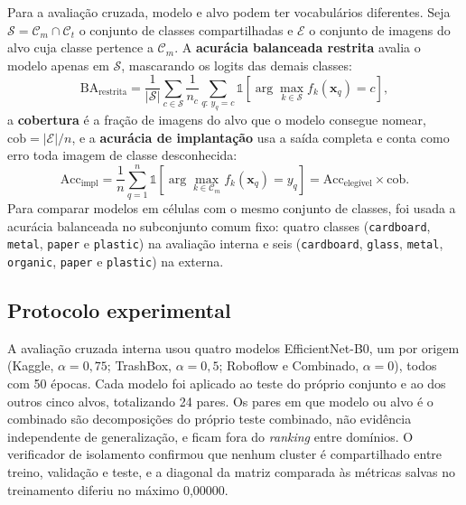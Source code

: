 \documentclass[11pt,a4paper]{article}
\begin{document}
	Para a avaliação cruzada, modelo e alvo podem ter vocabulários diferentes. Seja $\mathcal{S} = \mathcal{C}_m \cap \mathcal{C}_t$ o conjunto de classes compartilhadas e $\mathcal{E}$ o conjunto de imagens do alvo cuja classe pertence a $\mathcal{C}_m$. A \textbf{acurácia balanceada restrita} avalia o modelo apenas em $\mathcal{S}$, mascarando os logits das demais classes:
	\begin{equation}
		\text{BA}_{\text{restrita}} = \frac{1}{|\mathcal{S}|} \sum_{c \in \mathcal{S}} \frac{1}{n_c} \sum_{q:\, y_q = c} \mathbb{1}\!\left[\arg\max_{k \in \mathcal{S}} f_k(\mathbf{x}_q) = c\right],
		\label{eq:ba-restrita}
	\end{equation}
	a \textbf{cobertura} é a fração de imagens do alvo que o modelo consegue nomear, $\text{cob} = |\mathcal{E}|/n$, e a \textbf{acurácia de implantação} usa a saída completa e conta como erro toda imagem de classe desconhecida:
	\begin{equation}
		\text{Acc}_{\text{impl}} = \frac{1}{n} \sum_{q=1}^{n} \mathbb{1}\left[\arg\max_{k \in \mathcal{C}_m} f_k(\mathbf{x}_q) = y_q\right] = \text{Acc}_{\text{elegível}} \times \text{cob}.
		\label{eq:impl}
	\end{equation}
	Para comparar modelos em células com o mesmo conjunto de classes, foi usada a acurácia balanceada no subconjunto comum fixo: quatro classes (\texttt{cardboard}, \texttt{metal}, \texttt{paper} e \texttt{plastic}) na avaliação interna e seis (\texttt{cardboard}, \texttt{glass}, \texttt{metal}, \texttt{organic}, \texttt{paper} e \texttt{plastic}) na externa.
	
	\subsection{Protocolo experimental}
	
	A avaliação cruzada interna usou quatro modelos EfficientNet-B0, um por origem (Kaggle, $\alpha = 0{,}75$; TrashBox, $\alpha = 0{,}5$; Roboflow e Combinado, $\alpha = 0$), todos com 50 épocas. Cada modelo foi aplicado ao teste do próprio conjunto e ao dos outros cinco alvos, totalizando 24 pares. Os pares em que modelo ou alvo é o combinado são decomposições do próprio teste combinado, não evidência independente de generalização, e ficam fora do \emph{ranking} entre domínios. O verificador de isolamento confirmou que nenhum cluster é compartilhado entre treino, validação e teste, e a diagonal da matriz comparada às métricas salvas no treinamento diferiu no máximo 0,00000.
	
\end{document}
